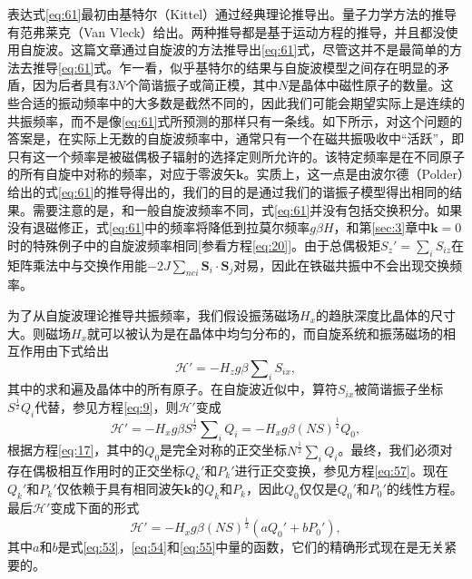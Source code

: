 \documentclass{article}
\begin{document}
表达式\eqref{eq:61}最初由基特尔（Kittel）通过经典理论推导出。量子力学方法的推导有范弗莱克（Van Vleck）给出。两种推导都是基于运动方程的推导，并且都没使用自旋波。这篇文章通过自旋波的方法推导出\eqref{eq:61}式，尽管这并不是最简单的方法去推导\eqref{eq:61}式。乍一看，似乎基特尔的结果与自旋波模型之间存在明显的矛盾，因为后者具有$3N$个简谐振子或简正模，其中$N$是晶体中磁性原子的数量。这些合适的振动频率中的大多数是截然不同的，因此我们可能会期望实际上是连续的共振频率，而不是像\eqref{eq:61}式所预测的那样只有一条线。如下所示，对这个问题的答案是，在实际上无数的自旋波频率中，通常只有一个在磁共振吸收中“活跃”，即只有这一个频率是被磁偶极子辐射的选择定则所允许的。该特定频率是在不同原子的所有自旋中对称的频率，对应于零波矢$\mathbf{k}$。实质上，这一点是由波尔德（Polder）给出的式\eqref{eq:61}的推导得出的，我们的目的是通过我们的谐振子模型得出相同的结果。需要注意的是，和一般自旋波频率不同，式\eqref{eq:61}并没有包括交换积分。如果没有退磁修正，式\eqref{eq:61}中的频率将降低到拉莫尔频率$g\beta H$，和第\ref{sec:3}章中$\mathbf{k}=0$时的特殊例子中的自旋波频率相同[参看方程\eqref{eq:20}]。由于总偶极矩$S_z'=\sum_i S_{iz}$在矩阵乘法中与交换作用能$-2J\sum_{\mathit{nei}}\mathbf{S}_i\cdot\mathbf{S}_j$对易，因此在铁磁共振中不会出现交换频率。

为了从自旋波理论推导共振频率，我们假设振荡磁场$H_x$的趋肤深度比晶体的尺寸大。则磁场$H_x$就可以被认为是在晶体中均匀分布的，而自旋系统和振荡磁场的相互作用由下式给出
\begin{equation} \label{eq:62}
\mathcal{H}'=-H_zg\beta\sum\nolimits_iS_{ix},
\end{equation}
其中的求和遍及晶体中的所有原子。在自旋波近似中，算符$S_{ix}$被简谐振子坐标$S^{\frac{1}{2}}Q_i$代替，参见方程\eqref{eq:9}，则$\mathcal{H}'$变成
\begin{equation} \label{eq:63}
\mathcal{H}'=-H_xg\beta S^{\frac{1}{2}}\sum\nolimits_iQ_i=-H_xg\beta(NS)^{\frac{1}{2}}Q_0,
\end{equation}
根据方程\eqref{eq:17}，其中的$Q_0$是完全对称的正交坐标$N^\frac{1}{2}\sum_i Q_i$。最终，我们必须对存在偶极相互作用时的正交坐标$Q_k'$和$P_k'$进行正交变换，参见方程\eqref{eq:57}。现在$Q_k'$和$P_k'$仅依赖于具有相同波矢$\mathbf{k}$的$Q_k$和$P_k$，因此$Q_0$仅仅是$Q_0'$和$P_0'$的线性方程。最后$\mathcal{H}'$变成下面的形式
\begin{equation} \label{eq:64}
\mathcal{H}'=-H_xg\beta(NS)^{\frac{1}{2}}(aQ_0'+bP_0'),
\end{equation}
其中$a$和$b$是式\eqref{eq:53}，\eqref{eq:54}和\eqref{eq:55}中量的函数，它们的精确形式现在是无关紧要的。
\end{document}
